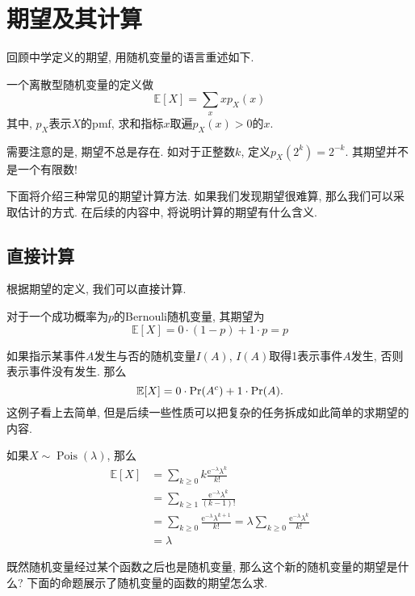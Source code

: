 \documentclass{ctexart}
\begin{document}
\section{期望及其计算} 回顾中学定义的期望, 用随机变量的语言重述如下.
\begin{definition}[期望]
    一个离散型随机变量的定义做
    $$
\mathbb{E}[X]=\sum_x x p_X(x)
$$
其中, $p_X$表示$X$的pmf, 求和指标$x$取遍$p_X(x)>0$的$x$. 
\end{definition}

需要注意的是, 期望不总是存在. 如对于正整数$k$, 定义$p_X\left(2^k\right)=2^{-k}$. 其期望并不是一个有限数! 

下面将介绍三种常见的期望计算方法. 如果我们发现期望很难算, 那么我们可以采取估计的方式. 在后续的内容中, 将说明计算的期望有什么含义. 

\subsection{直接计算} 根据期望的定义, 我们可以直接计算. 

\begin{example}[指示器变量的期望]
    对于一个成功概率为$p$的Bernouli随机变量, 其期望为
    $$
\mathbb{E}[X]=0 \cdot(1-p)+1 \cdot p=p
$$

如果指示某事件$A$发生与否的随机变量$I(A)$, $I(A)$取得1表示事件$A$发生, 否则表示事件没有发生. 那么
\[
    \mathbb E[X]=0\cdot \Pr(A^c)+1\cdot \Pr(A).
\]
这例子看上去简单, 但是后续一些性质可以把复杂的任务拆成如此简单的求期望的内容.     

\end{example}

\begin{example}[Possion随机变量]
    如果$X \sim \operatorname{Pois}(\lambda)$, 那么
    $$
\begin{aligned}
\mathbb{E}[X] & =\sum_{k \geq 0} k \frac{\mathrm{e}^{-\lambda} \lambda^k}{k!} \\
& =\sum_{k \geq 1} \frac{\mathrm{e}^{-\lambda} \lambda^k}{(k-1)!} \\
& =\sum_{k \geq 0} \frac{\mathrm{e}^{-\lambda} \lambda^{k+1}}{k!}=\lambda \sum_{k \geq 0} \frac{\mathrm{e}^{-\lambda} \lambda^k}{k!} \\
& =\lambda
\end{aligned}
$$    
\end{example}

既然随机变量经过某个函数之后也是随机变量, 那么这个新的随机变量的期望是什么? 下面的命题展示了随机变量的函数的期望怎么求.
\end{document}
